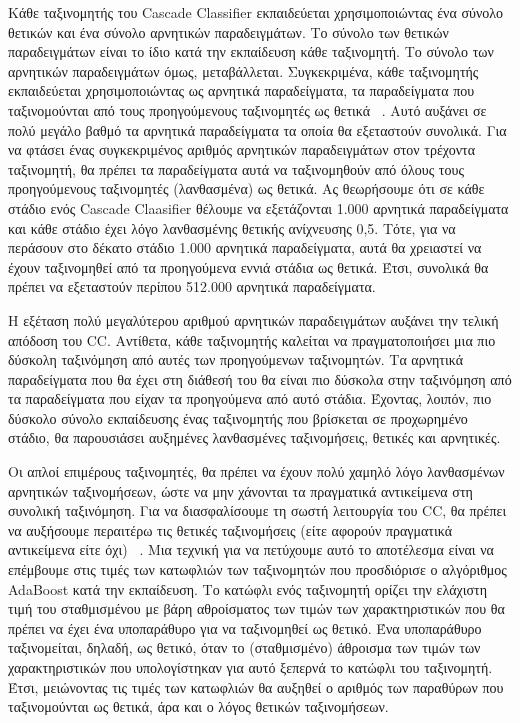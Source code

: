 Κάθε ταξινομητής του Cascade Classifier εκπαιδεύεται χρησιμοποιώντας ένα σύνολο θετικών και ένα
σύνολο αρνητικών παραδειγμάτων. Το σύνολο των θετικών παραδειγμάτων είναι το ίδιο
κατά την εκπαίδευση κάθε ταξινομητή. Το σύνολο των αρνητικών παραδειγμάτων όμως,
μεταβάλλεται. Συγκεκριμένα, κάθε ταξινομητής εκπαιδεύεται χρησιμοποιώντας ως
αρνητικά παραδείγματα, τα παραδείγματα που ταξινομούνται από τους προηγούμενους ταξινομητές
ως θετικά ~\cite{Viola01rapidobject}. Αυτό αυξάνει σε πολύ μεγάλο βαθμό τα
αρνητικά παραδείγματα τα οποία θα εξεταστούν συνολικά. Για να φτάσει ένας συγκεκριμένος
αριθμός αρνητικών παραδειγμάτων στον τρέχοντα ταξινομητή, θα πρέπει τα παραδείγματα αυτά
να ταξινομηθούν από όλους τους προηγούμενους ταξινομητές (λανθασμένα) ως θετικά.
Ας θεωρήσουμε ότι σε κάθε στάδιο ενός Cascade Claasifier θέλουμε να εξετάζονται 1.000 αρνητικά
παραδείγματα και κάθε στάδιο έχει λόγο λανθασμένης θετικής ανίχνευσης 0,5. Τότε, για να
περάσουν στο δέκατο στάδιο 1.000 αρνητικά παραδείγματα, αυτά θα χρειαστεί να έχουν
ταξινομηθεί από τα προηγούμενα εννιά στάδια ως θετικά. Έτσι, συνολικά θα πρέπει να εξεταστούν
περίπου 512.000 αρνητικά παραδείγματα.

Η εξέταση πολύ μεγαλύτερου αριθμού αρνητικών παραδειγμάτων αυξάνει την τελική απόδοση
του CC. Αντίθετα, κάθε ταξινομητής καλείται να πραγματοποιήσει μια πιο δύσκολη ταξινόμηση
από αυτές των προηγούμενων ταξινομητών. Τα αρνητικά παραδείγματα που θα έχει στη διάθεσή
του θα είναι πιο δύσκολα στην ταξινόμηση από τα παραδείγματα που είχαν τα προηγούμενα από
αυτό στάδια. Έχοντας, λοιπόν, πιο δύσκολο σύνολο εκπαίδευσης ένας ταξινομητής που βρίσκεται
σε προχωρημένο στάδιο, θα παρουσιάσει αυξημένες λανθασμένες ταξινομήσεις, θετικές και
αρνητικές.

Οι απλοί επιμέρους ταξινομητές, θα πρέπει να έχουν πολύ χαμηλό λόγο λανθασμένων
αρνητικών ταξινομήσεων, ώστε να μην χάνονται τα πραγματικά αντικείμενα στη συνολική
ταξινόμηση. Για να διασφαλίσουμε τη σωστή λειτουργία του CC, θα πρέπει να αυξήσουμε
περαιτέρω τις θετικές ταξινομήσεις (είτε αφορούν πραγματικά αντικείμενα είτε όχι)
~\cite{Viola01rapidobject}. Μια τεχνική για να πετύχουμε αυτό το αποτέλεσμα είναι
να επέμβουμε στις τιμές των κατωφλιών των ταξινομητών που προσδιόρισε ο αλγόριθμος
AdaBoost κατά την εκπαίδευση. Το κατώφλι ενός ταξινομητή ορίζει την ελάχιστη τιμή
του σταθμισμένου με βάρη αθροίσματος των τιμών των χαρακτηριστικών που θα πρέπει
να έχει ένα υποπαράθυρο για να ταξινομηθεί ως θετικό. Ένα υποπαράθυρο ταξινομείται,
δηλαδή, ως θετικό, όταν το (σταθμισμένο) άθροισμα των τιμών των χαρακτηριστικών που
υπολογίστηκαν για αυτό ξεπερνά το κατώφλι του ταξινομητή. Έτσι, μειώνοντας τις
τιμές των κατωφλιών θα αυξηθεί ο αριθμός των παραθύρων που ταξινομούνται ως
θετικά, άρα και ο λόγος θετικών ταξινομήσεων.

